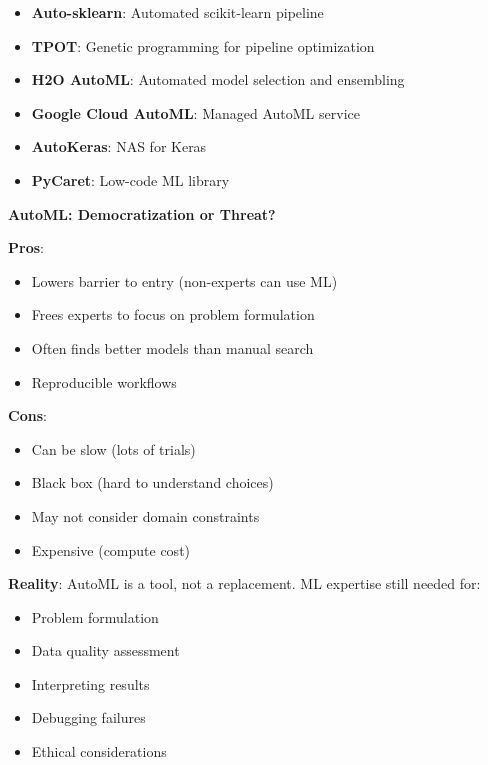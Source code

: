 \documentclass[11pt,twoside]{article}
\numberwithin{equation}{section}
\theoremstyle{plain}
\theoremstyle{definition}
\theoremstyle{remark}
\newenvironment{keyidea}{
  \begin{tcolorbox}[colback=yellow!5!white,
                    colframe=yellow!50!black,
                    title=Key Idea,
                    breakable,
                    enhanced,
                    sharp corners,
                    boxrule=0.8pt,
                    left=6pt, right=6pt, top=6pt, bottom=6pt]
}{
  \end{tcolorbox}
}
\begin{document}
\begin{itemize}
\item \textbf{Auto-sklearn}: Automated scikit-learn pipeline
\item \textbf{TPOT}: Genetic programming for pipeline optimization
\item \textbf{H2O AutoML}: Automated model selection and ensembling
\item \textbf{Google Cloud AutoML}: Managed AutoML service
\item \textbf{AutoKeras}: NAS for Keras
\item \textbf{PyCaret}: Low-code ML library
\end{itemize}

\begin{keyidea}
\textbf{AutoML: Democratization or Threat?}

\textbf{Pros}:
\begin{itemize}
\item Lowers barrier to entry (non-experts can use ML)
\item Frees experts to focus on problem formulation
\item Often finds better models than manual search
\item Reproducible workflows
\end{itemize}

\textbf{Cons}:
\begin{itemize}
\item Can be slow (lots of trials)
\item Black box (hard to understand choices)
\item May not consider domain constraints
\item Expensive (compute cost)
\end{itemize}

\textbf{Reality}: AutoML is a tool, not a replacement. ML expertise still needed for:
\begin{itemize}
\item Problem formulation
\item Data quality assessment
\item Interpreting results
\item Debugging failures
\item Ethical considerations
\end{itemize}
\end{keyidea}
\end{document}
